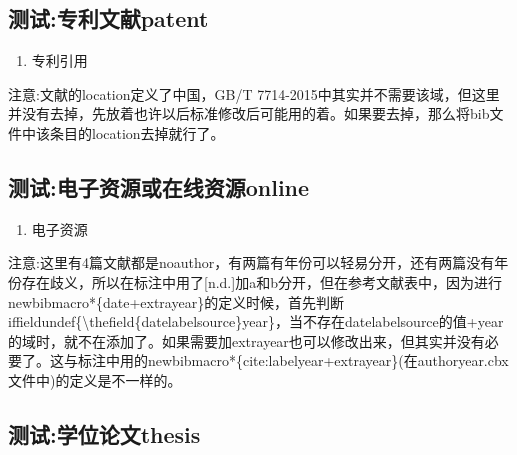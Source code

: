 \subsection{测试:专利文献patent}

\begin{refsection}

\begin{enumerate}
  \item 专利引用\cite{KOSEKI2002--,TACHIBANA2002--,河北绿洲生态环境科技有限公司2001--,姜锡洲1989--,刘加林1993--,西安电子科技大学2002--,张凯军2012-04-05--}
\end{enumerate}

注意:文献\cite{刘加林1993--}的location定义了中国，GB/T 7714-2015中其实并不需要该域，但这里并没有去掉，先放着也许以后标准修改后可能用的着。如果要去掉，那么将bib文件中该条目的location去掉就行了。

\printbibliography[heading=bibliography,title=【专利】]
\end{refsection}

\subsection{测试:电子资源或在线资源online}

\begin{refsection}

\begin{enumerate}
  \item 电子资源\cite{Commonwealth--,HOPKINSON--,OMG2003--,OCLC--,李强2012-05-03--,萧钰2001--,Alliance--,Dublin2012-06-14--,JabRef中文手册--,1989--}
\end{enumerate}

注意:这里有4篇文献都是noauthor，有两篇有年份可以轻易分开，还有两篇没有年份存在歧义，所以在标注中用了[n.d.]加a和b分开，但在参考文献表中，因为进行newbibmacro*\{date+extrayear\}的定义时候，首先判断iffieldundef\{\textbackslash thefield\{datelabelsource\}year\}，当不存在datelabelsource的值+year的域时，就不在添加了。如果需要加extrayear也可以修改出来，但其实并没有必要了。这与标注中用的newbibmacro*\{cite:labelyear+extrayear\}(在authoryear.cbx文件中)的定义是不一样的。

\printbibliography[heading=bibliography,title=【电子资源】]
\end{refsection}


\subsection{测试:学位论文thesis}

